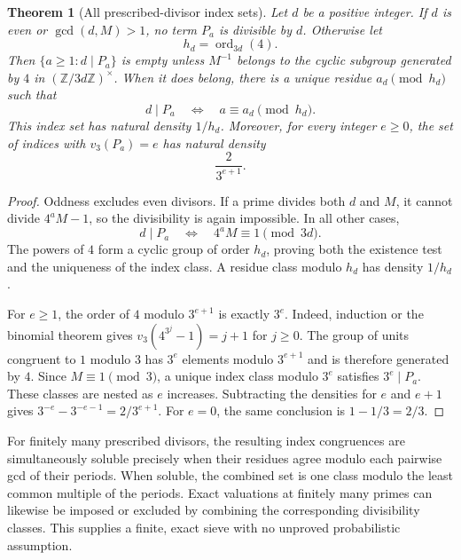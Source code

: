 \documentclass[11pt,a4paper]{article}
\newtheorem{theorem}{Theorem}[section]
\theoremstyle{definition}
\theoremstyle{remark}
\numberwithin{equation}{section}
\DeclareMathOperator{\ord}{ord}
\begin{document}
\begin{theorem}[All prescribed-divisor index sets]\label{A:thm:inverse-local-periods}
Let $d$ be a positive integer. If $d$ is even or $\gcd(d,M)>1$, no term
$P_a$ is divisible by $d$. Otherwise let
\[
 h_d=\ord_{3d}(4).
\]
Then $\{a\ge1:d\mid P_a\}$ is empty unless $M^{-1}$ belongs to the cyclic
subgroup generated by $4$ in $(\mathbb Z/3d\mathbb Z)^\times$. When it
does belong, there is a unique residue $a_d\pmod{h_d}$ such that
\[
 d\mid P_a\quad\Longleftrightarrow\quad a\equiv a_d\pmod{h_d}.
\]
This index set has natural density $1/h_d$. Moreover, for every integer
$e\ge0$, the set of indices with $v_3(P_a)=e$ has natural density
\[
 \frac{2}{3^{e+1}}.
\]
\end{theorem}
\begin{proof}
Oddness excludes even divisors. If a prime divides both $d$ and $M$, it
cannot divide $4^aM-1$, so the divisibility is again impossible. In all
other cases,
\[
 d\mid P_a\quad\Longleftrightarrow\quad4^aM\equiv1\pmod{3d}.
\]
The powers of $4$ form a cyclic group of order $h_d$, proving both the
existence test and the uniqueness of the index class. A residue class
modulo $h_d$ has density $1/h_d$.

For $e\ge1$, the order of $4$ modulo $3^{e+1}$ is exactly $3^e$.
Indeed, induction or the binomial theorem gives
$v_3(4^{3^j}-1)=j+1$ for $j\ge0$. The group of units congruent to $1$
modulo $3$ has $3^e$ elements modulo $3^{e+1}$ and is therefore generated
by $4$. Since $M\equiv1\pmod3$, a unique index class modulo $3^e$ satisfies
$3^e\mid P_a$. These classes are nested as $e$ increases. Subtracting
the densities for $e$ and $e+1$ gives
$3^{-e}-3^{-e-1}=2/3^{e+1}$. For $e=0$, the same conclusion is
$1-1/3=2/3$.
\end{proof}

For finitely many prescribed divisors, the resulting index congruences
are simultaneously soluble precisely when their residues agree modulo
each pairwise gcd of their periods. When soluble, the combined set is
one class modulo the least common multiple of the periods. Exact
valuations at finitely many primes can likewise be imposed or excluded
by combining the corresponding divisibility classes. This supplies a
finite, exact sieve with no unproved probabilistic assumption.
\end{document}
